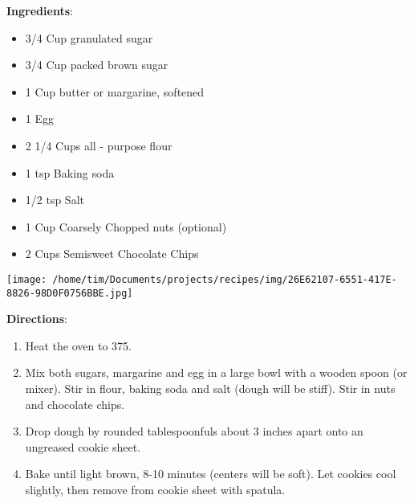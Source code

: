 \documentclass[11pt, twoside, openany]{book}
\begin{document}
\begin{minipage}[t]{0.8\linewidth}
\textbf{Ingredients}:\vspace{-3mm}
\begin{multicols}{2}
\begin{itemize}\setlength\itemsep{-1mm}
\item 3/4 Cup granulated sugar
\item 3/4 Cup packed brown sugar
\item 1 Cup butter or margarine, softened
\item 1 Egg
\item 2 1/4 Cups all - purpose flour
\item 1 tsp Baking soda
\item 1/2 tsp Salt
\item 1 Cup Coarsely Chopped nuts (optional)
\item 2 Cups Semisweet Chocolate Chips
\end{itemize}
\end{multicols}
\end{minipage}
\begin{minipage}[t]{0.2\linewidth}
\centering \strut\vspace*{-\baselineskip}\newline
\texttt{[image: /home/tim/Documents/projects/recipes/img/26E62107-6551-417E-8826-98D0F0756BBE.jpg]}\\
\end{minipage}\vspace{3mm}
\textbf{Directions}:
\vspace{-3mm}\begin{enumerate}\setlength\itemsep{-1mm}
\item Heat the oven to 375. 
\item Mix both sugars, margarine and egg in a large bowl with a wooden spoon (or mixer). Stir in flour, baking soda and salt (dough will be stiff). Stir in nuts and chocolate chips.
\item Drop dough by rounded tablespoonfuls about 3 inches apart onto an ungreased cookie sheet. 
\item Bake until light brown, 8-10 minutes (centers will be soft). Let cookies cool slightly, then remove from cookie sheet with spatula. 
\end{enumerate}
 \label{crockpot-chicken-chili}\hfill\textit{}\\
\end{document}
